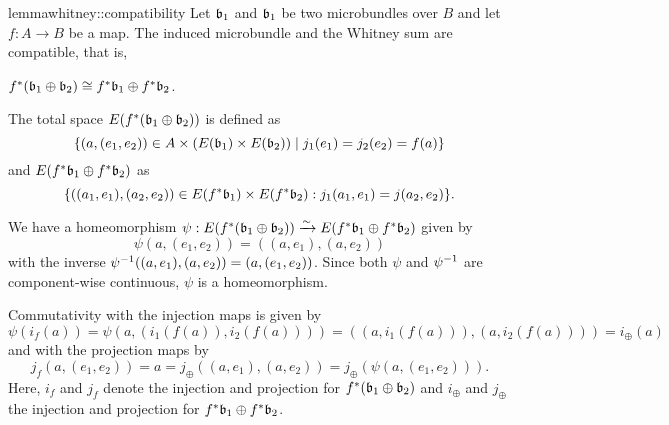 \begin{scope} \newcommand{\wleft}{\ind{f} (\whitney{\bb_1}{\bb_2})} \newcommand{\wright}{\whitney{\ind{f}\bb_1}{\ind{f}\bb_2}}

\begin{mystatement}{lemma}{whitney::compatibility} Let $\bb_1$ and $\bb_1$ be two microbundles over $B$ and let $f: A \to B$ be a map. The induced microbundle and the Whitney sum are compatible, that is, \begin{center} $\wleft \cong \wright$. \end{center} \end{mystatement}

\begin{myproof} The total space $E(\wleft)$ is defined as \[ \{(a, (e_1, e_2)) \in A \cross (E(\bb_1) \cross E(\bb_2)) \mid j_1(e_1) = j_2(e_2) = f(a) \} \] and $E(\wright)$ as \[ \set{((a_1, e_1), (a_2, e_2)) \in E(\ind{f}\bb_1) \cross E(\ind{f}\bb_2)}{j_1(a_1, e_1) = j(a_2, e_2)}. \]

We have a homeomorphism $\psi: E(\wleft) \isomto E(\wright)$ given by \[ \psi(a, (e_1, e_2)) = ((a, e_1), (a, e_2)) \] with the inverse $\psi^{-1}((a, e_1), (a, e_2)) = (a, (e_1, e_2))$. Since both $\psi$ and $\psi^{-1}$ are component-wise continuous, $\psi$ is a homeomorphism.

Commutativity with the injection maps is given by \[ \psi(i_f(a)) = \psi(a, (i_1(f(a)), i_2(f(a)))) = ((a, i_1(f(a))), (a, i_2(f(a)))) = i_\oplus(a) \] and with the projection maps by \[ j_f(a, (e_1, e_2)) = a = j_\oplus((a, e_1), (a, e_2)) = j_\oplus(\psi(a, (e_1, e_2))). \] Here, $i_f$ and $j_f$ denote the injection and projection for $\wleft$ and $i_\oplus$ and $j_\oplus$ the injection and projection for $\wright$. \end{myproof} \end{scope}